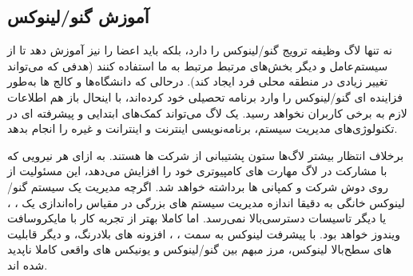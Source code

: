 \subsection{آموزش گنو/لینوکس}

نه تنها لاگ وظیفه ترویج گنو/لینوکس را دارد، بلکه باید اعضا را نیز آموزش دهد
تا از سیستم‌عامل و دیگر بخش‌های مرتبط مرتبط به ما استفاده کنند (هدفی که می‌تواند
تغییر زیادی در منطقه محلی فرد ایجاد کند). 
درحالی که دانشگاه‌ها و کالج ها به‌طور فزاینده ای گنو/لینوکس را
وارد برنامه تحصیلی خود کرده‌اند، با اینحال باز هم اطلاعات لازم به برخی کاربران نخواهد رسید.
یک لاگ می‌تواند کمک‌های ابتدایی و پیشرفته ای در تکنولوژی‌های مدیریت سیستم، برنامه‌نویسی
اینترنت و اینترانت و غیره را انجام بدهد.

برخلاف انتظار بیشتر لاگ‌ها ستون پشتیبانی از شرکت ها هستند.
به ازای هر نیرویی که با مشارکت در لاگ مهارت های کامپیوتری خود را
افزایش می‌دهد، این مسئولیت از روی دوش شرکت و کمپانی ها برداشته خواهد شد.
اگرچه مدیریت یک سیستم گنو/لینوکس خانگی به دقیقا اندازه مدیریت سیستم های
بزرگی در مقیاس راه‌اندازی یک
،
،
یا دیگر تاسیسات دسترسی‌بالا نمی‌رسد. اما کاملا بهتر از تجربه کار با
مایکروسافت ویندوز خواهد بود.
با پیشرفت لینوکس به سمت
،
،
افزونه های بلادرنگ، و دیگر قابلیت های سطح‌بالا لینوکس،
مرز مبهم بین گنو/لینوکس و یونیکس های واقعی کاملا ناپدید شده اند.

